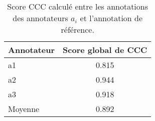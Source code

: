 \begin{table}[h]
  \centering
  \begin{tabular}{|l|c|}
  \hline
  Annotateur &Score global de CCC \\
  \hline
  a1       &0.815 \\
  a2       &0.944 \\
  a3       &0.918 \\
  \hline
  Moyenne  &0.892 \\
  \hline
  \end{tabular}
  \caption{Score CCC calculé entre les annotations des annotateurs $a_i$ et l'annotation de référence.}
  \label{tab:cccEntreAnnotateurs}
\end{table}
